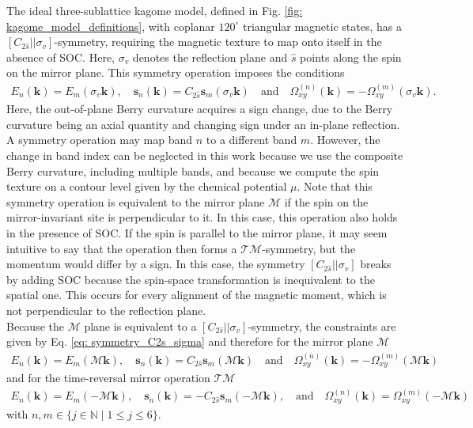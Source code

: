 The ideal three-sublattice kagome model, defined in Fig. \ref{fig: kagome_model_definitions}, with coplanar $120^\circ$ triangular magnetic states, has a $[C_{2{\hat{s}}}||\sigma_v]$-symmetry, requiring the magnetic texture to map onto itself in the absence of SOC. Here, $\sigma_v$ denotes the reflection plane and ${\hat{s}}$ points along the spin on the mirror plane. This symmetry operation imposes the conditions
\begin{align}
    E_n(\mathbf{k}) = E_m(\sigma_v\mathbf{k}), \quad \mathbf{s}_n(\mathbf{k})= C_{2{\hat{s}}}\mathbf{s}_m(\sigma_v\mathbf{k})\quad \text{and} \quad {\Omega}_{xy}^{(n)}(\mathbf{k}) = -{\Omega}_{xy}^{(m)}(\sigma_v\mathbf{k}).
    \label{eq: symmetry_C2s_sigma}
\end{align}
Here, the out-of-plane Berry curvature acquires a sign change, due to the Berry curvature being an axial quantity and changing sign under an in-plane reflection. A symmetry operation may map band $n$ to a different band $m$. However, the change in band index can be neglected in this work because we use the composite Berry curvature, including multiple bands, and because we compute the spin texture on a contour level given by the chemical potential $\mu$.
Note that this symmetry operation is equivalent to the mirror plane $\mathcal{M}$ if the spin on the mirror-invariant site is perpendicular to it. In this case, this operation also holds in the presence of SOC. 
If the spin is parallel to the mirror plane, it may seem intuitive to say that the operation then forms a $\mathcal{TM}$-symmetry, but the momentum would differ by a sign. In this case, the symmetry $[C_{2\hat{s}}||\sigma_v]$ breaks by adding SOC because the spin-space transformation is inequivalent to the spatial one. This occurs for every alignment of the magnetic moment, which is not perpendicular to the reflection plane.\\
Because the $\mathcal{M}$ plane is equivalent to a $[C_{2{\hat{s}}}||\sigma_v]$-symmetry, the constraints are given by Eq. \eqref{eq: symmetry_C2s_sigma} and therefore for the mirror plane $\mathcal{M}$
\begin{align}
    E_n(\mathbf{k}) = E_m(\mathcal{M}\mathbf{k}), \quad
    \mathbf{s}_n(\mathbf{k}) = C_{2{\hat{s}}}\mathbf{s}_m(\mathcal{M}\mathbf{k}) \quad \text{and} \quad 
    \Omega_{xy}^{(n)}(\mathbf{k}) = -\Omega_{xy}^{(m)}(\mathcal{M}\mathbf{k})
    \label{eq: symmetry_M}
\end{align}
and for the time-reversal mirror operation $\mathcal{TM}$
\begin{align}
E_n(\mathbf{k}) = E_m(-\mathcal{M}\mathbf{k}),\quad
\mathbf{s}_n(\mathbf{k}) = -C_{2{\hat{s}}} \mathbf{s}_m(-\mathcal{M}\mathbf{k}), \quad \text{and} \quad 
\Omega_{xy}^{(n)}(\mathbf{k}) = \Omega_{xy}^{(m)}(-\mathcal{M}\mathbf{k})
\label{eq: symmetry_TM}
\end{align} with $n,m\in\{j\in\mathrm{\mathbb{N}}\mid 1\leq j\leq 6\}$. \\

